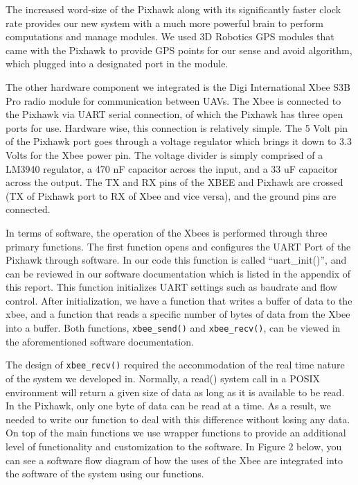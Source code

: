 \documentclass[12pt]{article}
\begin{document}
The increased word-size of the Pixhawk along with its significantly faster clock rate provides our new system with a much more powerful brain to perform computations and manage modules. We used 3D Robotics GPS modules that came with the Pixhawk to provide GPS points for our sense and avoid algorithm, which plugged into a designated port in the module.

The other hardware component we integrated is the Digi International Xbee S3B Pro radio module for communication between UAVs. The Xbee is connected to the Pixhawk via UART serial connection, of which the Pixhawk has three open ports for use. Hardware wise, this connection is relatively simple. The 5 Volt pin of the Pixhawk port goes through a voltage regulator which brings it down to 3.3 Volts for the Xbee power pin. The voltage divider is simply comprised of a LM3940 regulator, a 470 nF capacitor across the input, and a 33 uF capacitor across the output. The TX and RX pins of the XBEE and Pixhawk are crossed (TX of Pixhawk port to RX of Xbee and vice versa), and the ground pins are connected.

In terms of software, the operation of the Xbees is performed through three primary functions. The first function opens and configures the UART Port of the Pixhawk through software. In our code this function is called “uart\_init()”, and can be reviewed in our software documentation which is listed in the appendix of this report. This function initializes UART settings such as baudrate and flow control. After initialization, we have a function that writes a buffer of data to the xbee, and a function that reads a specific number of bytes of data from the Xbee into a buffer. Both functions, \texttt{xbee\_send()} and \texttt{xbee\_recv()}, can be viewed in the aforementioned software documentation.

The design of \texttt{xbee\_recv()} required the accommodation of the real time nature of the system we developed in. Normally, a read() system call in a POSIX environment will return a given size of data as long as it is available to be read. In the Pixhawk, only one byte of data can be read at a time. As a result, we needed to write our function to deal with this difference without losing any data. On top of the main functions we use wrapper functions to provide an additional level of functionality and customization to the software. In Figure 2 below, you can see a software flow diagram of how the uses of the Xbee are integrated into the software of the system using our functions.
\end{document}
